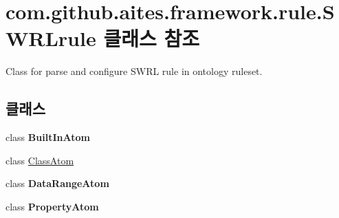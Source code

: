 \hypertarget{classcom_1_1github_1_1aites_1_1framework_1_1rule_1_1_s_w_r_lrule}{}\section{com.\+github.\+aites.\+framework.\+rule.\+S\+W\+R\+Lrule 클래스 참조}
\label{classcom_1_1github_1_1aites_1_1framework_1_1rule_1_1_s_w_r_lrule}


Class for parse and configure S\+W\+RL rule in ontology ruleset.  


\subsection*{클래스}
\begin{DoxyCompactItemize}
\item 
class {\bfseries Built\+In\+Atom}
\item 
class \mbox{\hyperlink{classcom_1_1github_1_1aites_1_1framework_1_1rule_1_1_s_w_r_lrule_1_1_class_atom}{Class\+Atom}}
\item 
class {\bfseries Data\+Range\+Atom}
\item 
class {\bfseries Property\+Atom}
\end{DoxyCompactItemize}
